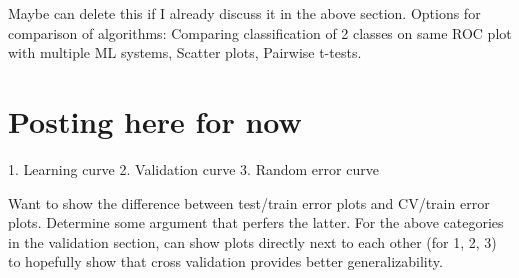 Maybe can delete this if I already discuss it in the above section. Options for
comparison of algorithms: Comparing classification of 2 classes on same ROC
plot with multiple ML systems, Scatter plots, Pairwise t-tests. 

\section{Posting here for now}

1. Learning curve
2. Validation curve
3. Random error curve

Want to show the difference between test/train error plots and CV/train error
plots.  Determine some argument that perfers the latter. For the above
categories in the validation section, can show plots directly next to each
other (for 1, 2, 3) to hopefully show that cross validation provides better
generalizability.


%
